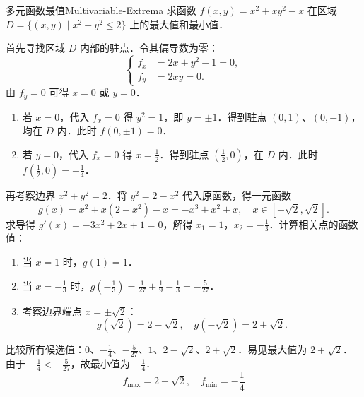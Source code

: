 \begin{problem}{多元函数最值}{Multivariable-Extrema}
    求函数 $f(x,y) = x^2 + xy^2 - x$ 在区域 $D = \{(x,y) \mid x^2 + y^2 \le 2\}$ 上的最大值和最小值．
\end{problem}

\begin{solution}
    首先寻找区域 $D$ 内部的驻点．令其偏导数为零：
    \begin{equation}
        \label{eq:stationary-points}
        \left\{ \begin{aligned}
            f_x & = 2x + y^2 - 1 = 0, \\
            f_y & = 2xy = 0.
        \end{aligned} \right.
    \end{equation}
    由 $f_y = 0$ 可得 $x=0$ 或 $y=0$．

    \begin{enumerate}
        \item 若 $x=0$，代入 $f_x=0$ 得 $y^2 = 1$，即 $y = \pm 1$．得到驻点 $(0, 1)$、$(0, -1)$，均在 $D$ 内．此时 $f(0, \pm 1) = 0$．
        \item 若 $y=0$，代入 $f_x=0$ 得 $x = \frac{1}{2}$．得到驻点 $(\frac{1}{2}, 0)$，在 $D$ 内．此时 $f(\frac{1}{2}, 0) = -\frac{1}{4}$．
    \end{enumerate}

    再考察边界 $x^2 + y^2 = 2$．将 $y^2 = 2 - x^2$ 代入原函数，得一元函数
    \begin{equation}
        g(x) = x^2 + x(2 - x^2) - x = -x^3 + x^2 + x, \quad x \in [-\sqrt{2}, \sqrt{2}].
    \end{equation}
    求导得 $g'(x) = -3x^2 + 2x + 1 = 0$，解得 $x_1 = 1$，$x_2 = -\frac{1}{3}$．计算相关点的函数值：
    \begin{enumerate}
        \item 当 $x=1$ 时，$g(1) = 1$．
        \item 当 $x=-\frac{1}{3}$ 时，$g(-\frac{1}{3}) = \frac{1}{27} + \frac{1}{9} - \frac{1}{3} = -\frac{5}{27}$．
        \item 考察边界端点 $x = \pm \sqrt{2}$：
              \begin{equation}
                  g(\sqrt{2}) = 2 - \sqrt{2}, \quad g(-\sqrt{2}) = 2 + \sqrt{2}.
              \end{equation}
    \end{enumerate}

    比较所有候选值：$0$、$-\frac{1}{4}$、$-\frac{5}{27}$、$1$、$2-\sqrt{2}$、$2+\sqrt{2}$．易见最大值为 $2+\sqrt{2}$．由于 $-\frac{1}{4} < -\frac{5}{27}$，故最小值为 $-\frac{1}{4}$．
    \begin{equation}
        \boxed{f_{\max} = 2 + \sqrt{2}, \quad f_{\min} = -\frac{1}{4}}
    \end{equation}
\end{solution}


